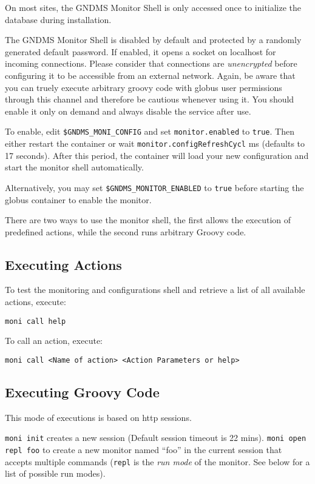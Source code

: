 \documentclass{article}
\begin{document}
On most sites, the GNDMS Monitor Shell is only accessed once to
initialize the database during installation.

The GNDMS Monitor Shell is disabled by default and protected by a
randomly generated default password. If enabled, it opens a socket
on localhost for incoming connections. Please consider that
connections are \emph{unencrypted} before configuring it to be
accessible from an external network. Again, be aware that you can
truely execute arbitrary groovy code with globus user permissions
through this channel and therefore be cautious whenever using it.
You should enable it only on demand and always disable the service
after use.

To enable, edit \verb!$GNDMS_MONI_CONFIG! and set
\verb!monitor.enabled! to \verb!true!. Then either restart the
container or wait \verb!monitor.configRefreshCycl! ms (defaults to
17 seconds). After this period, the container will load your new
configuration and start the monitor shell automatically.

Alternatively, you may set \verb!$GNDMS_MONITOR_ENABLED! to
\verb!true! before starting the globus container to enable the
monitor.

There are two ways to use the monitor shell, the first allows the
execution of predefined actions, while the second runs arbitrary
Groovy code.

\subsection{Executing Actions}

To test the monitoring and configurations shell and retrieve a list
of all available actions, execute:

\begin{verbatim}
moni call help
\end{verbatim}
To call an action, execute:

\begin{verbatim}
moni call <Name of action> <Action Parameters or help>
\end{verbatim}
\subsection{Executing Groovy Code}

This mode of executions is based on http sessions.

\verb!moni init! creates a new session (Default session timeout is
22 mins). \verb!moni open repl foo! to create a new monitor named
``foo'' in the current session that accepts multiple commands
(\verb!repl! is the \emph{run mode} of the monitor. See below for a
list of possible run modes).
\end{document}
